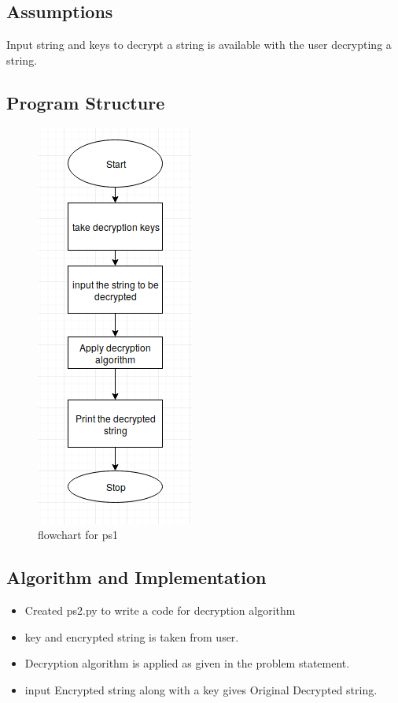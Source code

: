 \documentclass[a4paper,12pt]{article}
\begin{document}
	\subsection{Assumptions}
	Input string and keys to decrypt a string is available with the user decrypting a string.
	\newpage
	\subsection{Program Structure}
	
	
	\begin{figure}[h]
	\includegraphics[scale=0.8]{flow2.png}
	\caption{flowchart for ps1}
	\label{fig:flow}
	\end{figure}
	
	\newpage
	\subsection{Algorithm and Implementation}
	\begin{itemize}
		\item Created ps2.py to write a code for decryption algorithm 
		\item key and encrypted string is taken from user.
		\item Decryption algorithm is applied as given in the problem statement.
		\item input Encrypted string along with a key gives Original Decrypted string.
	\end{itemize}
\end{document}
